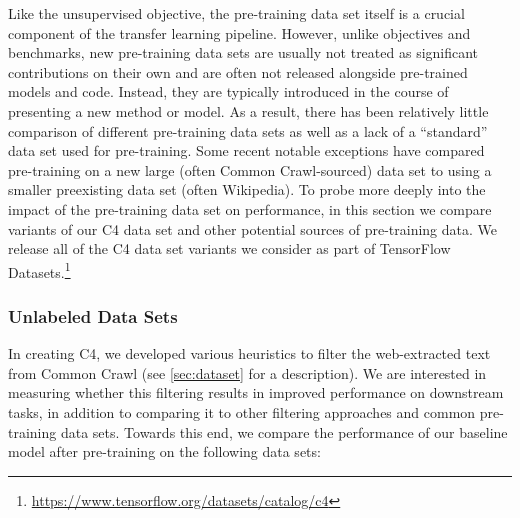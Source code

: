 Like the unsupervised objective, the pre-training data set itself is a crucial component of the transfer learning pipeline. However, unlike objectives and benchmarks, new pre-training data sets are usually not treated as significant contributions on their own and are often not released alongside pre-trained models and code. Instead, they are typically introduced in the course of presenting a new method or model. As a result, there has been relatively little comparison of different pre-training data sets as well as a lack of a ``standard'' data set used for pre-training. Some recent notable exceptions \citep{baevski2019cloze,liu2019roberta,yang2019xlnet} have compared pre-training on a new large (often Common Crawl-sourced) data set to using a smaller preexisting data set (often Wikipedia). To probe more deeply into the impact of the pre-training data set on performance, in this section we compare variants of our C4 data set and other potential sources of pre-training data. We release all of the C4 data set variants we consider as part of TensorFlow Datasets.\footnote{\url{https://www.tensorflow.org/datasets/catalog/c4}}

\subsubsection{Unlabeled Data Sets}
\label{sec:datasets_comparison}

In creating C4, we developed various heuristics to filter the web-extracted text from Common Crawl (see \ref{sec:dataset} for a description). We are interested in measuring whether this filtering results in improved performance on downstream tasks, in addition to comparing it to other filtering approaches and common pre-training data sets. Towards this end, we compare the performance of our baseline model after pre-training on the following data sets:

